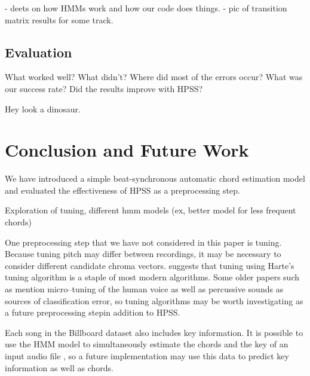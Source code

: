\documentclass{article}
\begin{document}
- deets on how HMMs work and how our code does things.
- pic of transition matrix results for some track.

\subsection{Evaluation}

What worked well? What didn't? Where did most of the errors occur?
What was our success rate? Did the results improve with HPSS?

Hey look a dinosaur.

\section{Conclusion and Future Work}

We have introduced a simple beat-synchronous automatic chord estimation model
and evaluated the effectiveness of HPSS as a preprocessing step.

Exploration of tuning, different hmm models (ex, better model for less frequent chords)

One preprocessing step that we have not considered in this paper is tuning. Because tuning pitch 
may differ between recordings, it may be necessary to consider different candidate chroma vectors. 
\cite{McVicar:00} suggests that tuning using Harte's tuning algorithm is a staple of most modern
algorithms. Some older papers such as \cite{Zenz:20} mention micro--tuning of the human voice as well 
as percussive sounds as sources of classification error, so tuning algorithms may be worth investigating 
as a future preprocessing stepin addition to HPSS. 

Each song in the Billboard dataset also includes key information. It is possible to use the HMM model to 
simultaneously estimate the chords and the key of an input audio file \cite{McVicar:00}, so a future
implementation may use this data to predict key information as well as chords.
\end{document}
